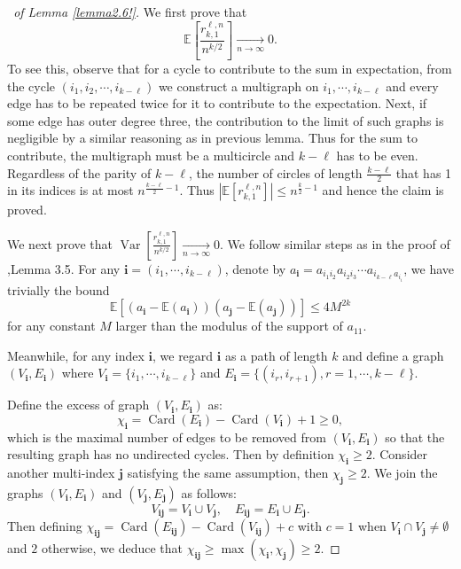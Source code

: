 \documentclass[12pt, reqno]{amsart}
\theoremstyle{definition}
\theoremstyle{remark}
\numberwithin{equation}{section}
\begin{document}
\begin{proof}[\proofname\ of Lemma \ref{lemma2.6!}]
    We first prove that 
     $$\mathbb{E}\left[ \frac{r_{k,1}^{\ell,n}}{n^{k/2}}\right]{\underset{n\to\infty}\longrightarrow}     0.$$
     To see this, observe that for a cycle to contribute to the sum in expectation, from the cycle $(i_1,i_2,\cdots,i_{k-\ell})$ we construct a multigraph on $i_1,\cdots,i_{k-\ell}$ and every edge has to be repeated twice for it to contribute to the expectation. Next, if some edge has outer degree three, the contribution to the limit of such graphs is negligible by a similar reasoning as in previous lemma. Thus for the sum to contribute, the multigraph must be a multicircle and $k-\ell$ has to be even. Regardless of the parity of $k-\ell$, the number of circles of length $\frac{k-\ell}{2}$ that has 1 in its indices is at most $n^{\frac{k-\ell}{2}-1}$. Thus $\left|\mathbb{E}[r_{k,1}^{\ell,n}]\right|\leq n^{\frac{k}{2}-1}$ and hence the claim is proved. 

We next prove that $\operatorname{Var}\left[\frac{r_{k,1}^{\ell,n}}{n^{k/2}}\right]{\underset{n\to\infty}\longrightarrow}    0.$ We follow similar steps as in the proof of \cite{bordenave2021convergence},Lemma 3.5. For any $\mathbf{i}=(i_1,\cdots,i_{k-\ell})$, denote by $a_\mathbf{i}=a_{i_1i_2}a_{i_2i_3}\cdots a_{i_{k-\ell}a_{i_i}}$, we have trivially the bound 
$$
\mathbb{E}[(a_\mathbf{i}-\mathbb{E}(a_\mathbf{i}))(a_\mathbf{j}-\mathbb{E}(a_\mathbf{j}))]\leq 4M^{2k} 
$$ for any constant $M$ larger than the modulus of the support of $a_{11}$. 

Meanwhile, for any index $\mathbf{i}$, we regard $\mathbf{i}$ as a path of length $k$ and define a graph $(V_\mathbf{i},E_\mathbf{i})$ where $V_\mathbf{i}=\{i_1,\cdots,i_{k-\ell}\}$ and $E_\mathbf{i}=\{(i_r,i_{r+1}), r=1,\cdots,k-\ell\}$. 

Define the excess of graph $(V_\mathbf{i},E_\mathbf{i})$ as:
$$
\chi_\mathbf{i}=\operatorname{Card}(E_\mathbf{i})-\operatorname{Card}(V_\mathbf{i})+1\geq 0,
$$ which is the maximal number of edges to be removed from $(V_\mathbf{i},E_\mathbf{i})$ so that the resulting graph has no undirected cycles.
Then by definition $\chi_\mathbf{i}\geq 2$. Consider another multi-index $\mathbf{j}$ satisfying the same assumption, then $\chi_\mathbf{j}\geq 2$. We join the graphs $(V_\mathbf{i},E_\mathbf{i})$ and $(V_\mathbf{j},E_\mathbf{j})$ as follows: 
$$
V_{\mathbf{i}\mathbf{j}}=V_\mathbf{i}\cup V_\mathbf{j},\quad E_{\mathbf{i}\mathbf{j}}=E_\mathbf{i}\cup E_\mathbf{j}.
$$
Then defining $\chi_{\mathbf{i}\mathbf{j}}=\operatorname{Card}(E_{\mathbf{i}\mathbf{j}})-\operatorname{Card}(V_{\mathbf{i}\mathbf{j}})+c $ with $c=1$ when $V_\mathbf{i}\cap V_\mathbf{j}\neq \emptyset$ and $2$ otherwise, we deduce that $\chi_{\mathbf{i}\mathbf{j}}\geq \max(\chi_\mathbf{i},\chi_\mathbf{j})\geq 2$.



\end{proof}
\end{document}

